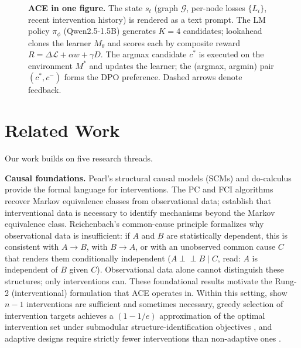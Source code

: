 \documentclass{article}
\theoremstyle{plain}
\theoremstyle{definition}
\theoremstyle{remark}
\begin{document}
\begin{figure}[t]
\centering

\caption{\textbf{ACE in one figure.} The state $s_t$ (graph $\mathcal{G}$, per-node losses $\{L_i\}$, recent intervention history) is rendered as a text prompt. The LM policy $\pi_\phi$ (Qwen2.5-1.5B) generates $K{=}4$ candidates; lookahead clones the learner $M_\theta$ and scores each by composite reward $R = \Delta\mathcal{L} + \alpha w + \gamma D$. The argmax candidate $c^{*}$ is executed on the environment $M^{*}$ and updates the learner; the (argmax, argmin) pair $(c^{*}, c^{-})$ forms the DPO preference. Dashed arrows denote feedback.}
\label{fig:framework}
\end{figure}

\section{Related Work}
\label{sec:related}

Our work builds on five research threads.

\textbf{Causal foundations.} Pearl's structural causal models (SCMs) and do-calculus \citep{pearl2009causality,pearl1995causal} provide the formal language for interventions. The PC and FCI algorithms \citep{spirtes2000causation} recover Markov equivalence classes from observational data; \citet{peters2017elements} establish that interventional data is necessary to identify mechanisms beyond the Markov equivalence class. Reichenbach's common-cause principle \citep{reichenbach1956} formalizes why observational data is insufficient: if $A$ and $B$ are statistically dependent, this is consistent with $A \to B$, with $B \to A$, or with an unobserved common cause $C$ that renders them conditionally independent ($A \perp\!\!\!\!\perp B \mid C$, read: $A$ is independent of $B$ given $C$). Observational data alone cannot distinguish these structures; only interventions can. These foundational results motivate the Rung-2 (interventional) formulation that ACE operates in. Within this setting, \citet{eberhardt2005number,eberhardt2006n} show $n-1$ interventions are sufficient and sometimes necessary, greedy selection of intervention targets achieves a $(1-1/e)$ approximation of the optimal intervention set under submodular structure-identification objectives \citep{shanmugam2015learning}, and adaptive designs require strictly fewer interventions than non-adaptive ones \citep{hauser2012characterization,cho2016reconstructing}.
\end{document}
